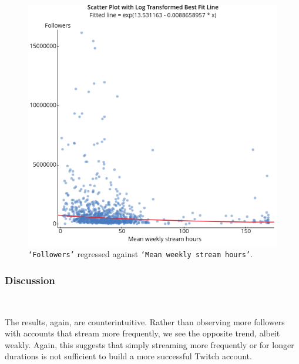 \documentclass[12pt]{article}
\begin{document}
\begin{figure}[H]
\centering
	\includegraphics[scale=0.65]{../StatCrunch_Results/ln_followers_stream/scatter_small}
	\captionsetup{justification=centering, singlelinecheck=false, margin=2cm}
	\caption[Scatter Plot: Followers by Stream Time]{\texttt{`Followers'} regressed against \texttt{`Mean weekly stream hours'}. }
	\label{fig:ln_followers_stream_scatter}
\end{figure}

\subsubsection{Discussion}\

The results, again, are counterintuitive. Rather than observing more followers with accounts that stream more frequently, we see the opposite trend, albeit weakly. Again, this suggests that simply streaming more frequently or for longer durations is not sufficient to build a more successful Twitch account.
\end{document}
